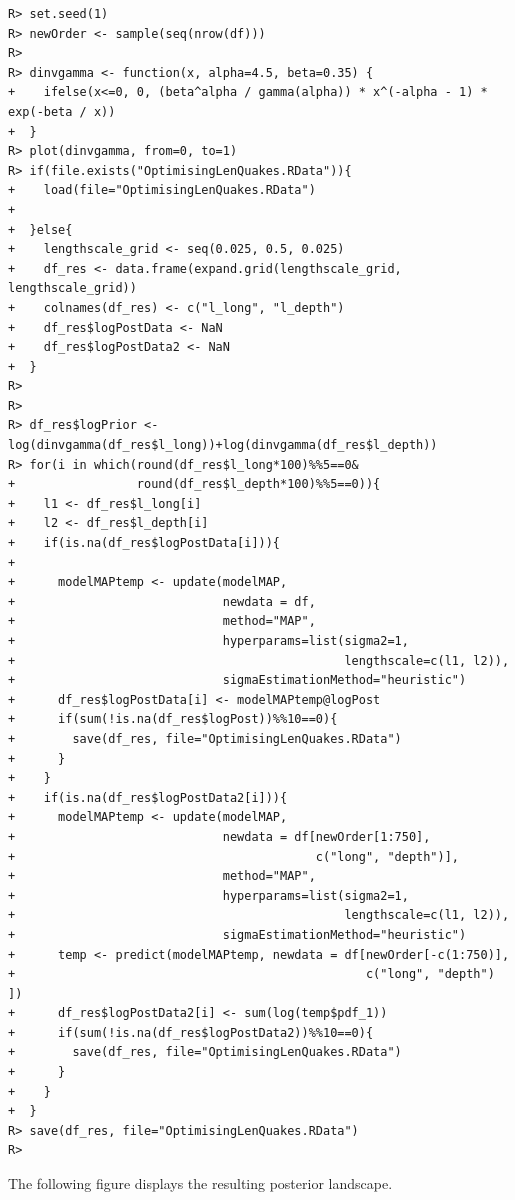 \documentclass[
]{article}
\begin{document}
\begin{verbatim}
R> set.seed(1)
R> newOrder <- sample(seq(nrow(df)))
R> 
R> dinvgamma <- function(x, alpha=4.5, beta=0.35) {
+    ifelse(x<=0, 0, (beta^alpha / gamma(alpha)) * x^(-alpha - 1) * exp(-beta / x))
+  }
R> plot(dinvgamma, from=0, to=1)
R> if(file.exists("OptimisingLenQuakes.RData")){
+    load(file="OptimisingLenQuakes.RData")
+    
+  }else{
+    lengthscale_grid <- seq(0.025, 0.5, 0.025)
+    df_res <- data.frame(expand.grid(lengthscale_grid, lengthscale_grid))
+    colnames(df_res) <- c("l_long", "l_depth")
+    df_res$logPostData <- NaN
+    df_res$logPostData2 <- NaN
+  }
R> 
R> 
R> df_res$logPrior <- log(dinvgamma(df_res$l_long))+log(dinvgamma(df_res$l_depth))
R> for(i in which(round(df_res$l_long*100)%%5==0&
+                 round(df_res$l_depth*100)%%5==0)){
+    l1 <- df_res$l_long[i]
+    l2 <- df_res$l_depth[i]
+    if(is.na(df_res$logPostData[i])){
+      
+      modelMAPtemp <- update(modelMAP, 
+                             newdata = df, 
+                             method="MAP", 
+                             hyperparams=list(sigma2=1, 
+                                              lengthscale=c(l1, l2)),
+                             sigmaEstimationMethod="heuristic")
+      df_res$logPostData[i] <- modelMAPtemp@logPost
+      if(sum(!is.na(df_res$logPost))%%10==0){
+        save(df_res, file="OptimisingLenQuakes.RData")
+      }
+    }
+    if(is.na(df_res$logPostData2[i])){
+      modelMAPtemp <- update(modelMAP, 
+                             newdata = df[newOrder[1:750], 
+                                          c("long", "depth")], 
+                             method="MAP", 
+                             hyperparams=list(sigma2=1, 
+                                              lengthscale=c(l1, l2)),
+                             sigmaEstimationMethod="heuristic")
+      temp <- predict(modelMAPtemp, newdata = df[newOrder[-c(1:750)], 
+                                                 c("long", "depth") ])
+      df_res$logPostData2[i] <- sum(log(temp$pdf_1))
+      if(sum(!is.na(df_res$logPostData2))%%10==0){
+        save(df_res, file="OptimisingLenQuakes.RData")
+      }
+    }
+  }
R> save(df_res, file="OptimisingLenQuakes.RData")
R> 
\end{verbatim}

The following figure displays the resulting posterior landscape.
\end{document}
